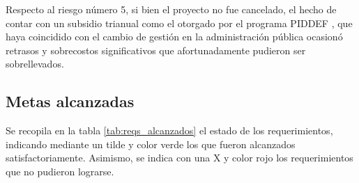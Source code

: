 Respecto al riesgo número 5, si bien el proyecto no fue cancelado, el hecho de contar con un subsidio trianual como el otorgado por el programa PIDDEF \citep{PIDDEF}, que haya coincidido con el cambio de gestión en la administración pública ocasionó retrasos y sobrecostos significativos que afortunadamente pudieron ser sobrellevados.


\subsection{Metas alcanzadas}
\label{subsec:metasalcanzadas}

Se recopila en la tabla \ref{tab:reqs_alcanzados} el estado de los requerimientos, indicando mediante un tilde y color verde los que fueron alcanzados satisfactoriamente.  Asimismo, se indica con una X y color rojo los requerimientos que no pudieron lograrse.

